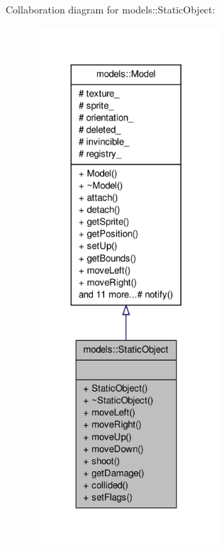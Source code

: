 \-Collaboration diagram for models\-:\-:\-Static\-Object\-:\nopagebreak
\begin{figure}[H]
\begin{center}
\leavevmode
\includegraphics[height=550pt]{de/d1a/classmodels_1_1StaticObject__coll__graph}
\end{center}
\end{figure}
